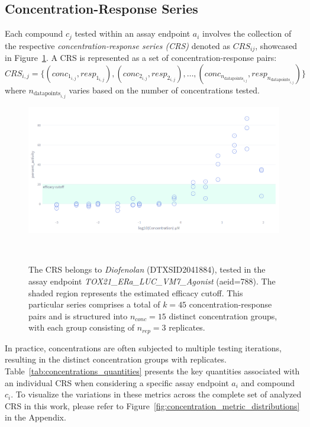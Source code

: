 \subsection{Concentration-Response Series}
Each compound $c_j$ tested within an assay endpoint $a_i$ involves the collection of the respective \emph{concentration-response series (CRS)} denoted as $CRS_{ij}$, showcased in Figure~\ref{fig:concentration_response_series}. A CRS is represented as a set of concentration-response pairs: 
\[ CRS_{i,j} = \{(conc_{1_{i,j}}, resp_{1_{i,j}}), (conc_{2_{i,j}}, resp_{2_{i,j}}), \dots, (conc_{n_{\text{datapoints}_{i,j}}}, resp_{n_{\text{datapoints}_{i,j}}})\} \] where $n_{\text{datapoints}_{i,j}}$ varies based on the number of concentrations tested. 

\begin{figure}
    \centering
    \includegraphics[width=1.0\textwidth]{figures/CRS.png}  
    \caption{The CRS belongs to \emph{Diofenolan} (DTXSID2041884), tested in the assay endpoint \emph{TOX21\_ERa\_LUC\_VM7\_Agonist} (aeid=788). The shaded region represents the estimated efficacy cutoff. This particular series comprises a total of $k = 45$ concentration-response pairs and is structured into $n_{conc} = 15$ distinct concentration groups, with each group consisting of $n_{rep} = 3$ replicates. }
~\label{fig:concentration_response_series} 
\end{figure}

In practice, concentrations are often subjected to multiple testing iterations, resulting in the distinct concentration groups with replicates. Table~\ref{tab:concentrations_quantities} presents the key quantities associated with an individual CRS when considering a specific assay endpoint $a_i$ and compound $c_i$. To visualize the variations in these metrics across the complete set of analyzed CRS in this work, please refer to Figure~\ref{fig:concentration_metric_distributions} in the Appendix. 

